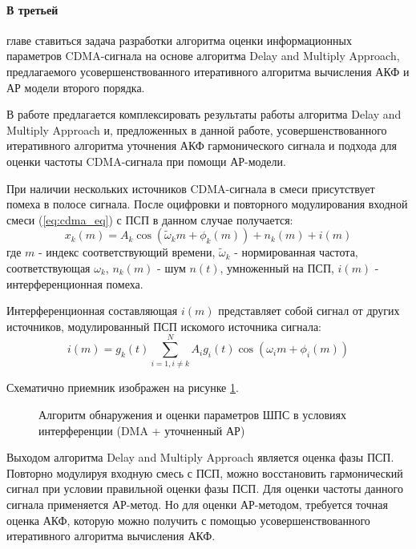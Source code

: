 \paragraph{В третьей} главе ставиться задача разработки алгоритма оценки информационных параметров CDMA-сигнала на основе алгоритма Delay and Multiply Approach,
предлагаемого усовершенствованного итеративного алгоритма вычисления АКФ и АР модели второго порядка.

В работе предлагается комплексировать результаты работы алгоритма Delay and Multiply Approach и, предложенных
в данной работе, усовершенствованного итеративного алгоритма уточнения АКФ гармонического
сигнала и подхода для оценки частоты CDMA-сигнала при помощи АР-модели.

При наличии нескольких источников CDMA-сигнала в смеси присутствует помеха в полосе сигнала.
После оцифровки и повторного модулирования входной смеси (\ref{eq:cdma_eq}) с ПСП в данном случае получается:
\begin{equation}
	\label{eq:cdma_strip_eq}
	x_k(m) = A_k \cos{(\tilde{\omega}_{k}m + \phi_k(m))} + n_k(m) + i(m)
\end{equation}
где ${m}$ - индекс соответствующий времени, ${\tilde{\omega}_k}$ - нормированная частота, соответствующая ${\omega_k}$, ${n_k}(m)$ - шум ${n(t)}$, умноженный на ПСП,
${i(m)}$ - интерференционная помеха.

Интерференционная составляющая ${i(m)}$ представляет собой сигнал от других источников, модулированный ПСП искомого источника сигнала:
\begin{equation}
	\label{eq:cdma_interference}
	i(m) = g_k(t) \sum\limits_{i=1, i \ne k}^{N}A_i g_i(t)\cos{(\omega_{i}m + \phi_i(m))}
\end{equation}

Схематично приемник изображен на рисунке \ref{pic:ar_dma_scheme}.
\begin{figure}[h]
\center{}
	\caption{Алгоритм обнаружения и оценки параметров ШПС в условиях интерференции (DMA + уточненный АР)}
	\label{pic:ar_dma_scheme}
\end{figure}

Выходом алгоритма Delay and Multiply Approach является оценка фазы ПСП. Повторно модулируя входную смесь с ПСП,
можно восстановить гармонический сигнал при условии правильной оценки фазы ПСП. Для оценки частоты данного сигнала применяется
АР-метод. Но для оценки АР-методом, требуется точная оценка АКФ, которую можно получить
с помощью усовершенствованного итеративного алгоритма вычисления АКФ.

